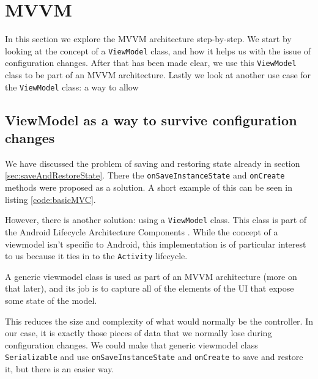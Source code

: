 \section{MVVM}
In this section we explore the MVVM architecture step-by-step. 
We start by looking at the concept of a \lstinline!ViewModel! class, and how it helps us with the issue of configuration changes.
After that has been made clear, we use this \lstinline!ViewModel! class to be part of an MVVM architecture. 
Lastly we look at another use case for the \lstinline!ViewModel! class: a way to allow 

\subsection{ViewModel as a way to survive configuration changes}
We have discussed the problem of saving and restoring state already in section \ref{sec:saveAndRestoreState}. 
There the \lstinline!onSaveInstanceState! and \lstinline!onCreate! methods were proposed as a solution.
A short example of this can be seen in listing \ref{code:basicMVC}.



However, there is another solution: using a \lstinline!ViewModel! class.
This class is part of the Android Lifecycle Architecture Components \cite{viewModelOfficial}.
While the concept of a viewmodel isn't specific to Android, this implementation is of particular interest to us because it ties in to the \lstinline!Activity! lifecycle.

A generic viewmodel class is used as part of an MVVM architecture (more on that later), and its job is to capture all of the elements of the UI that expose some state of the model.

This reduces the size and complexity of what would normally be the controller.
In our case, it is exactly those pieces of data that we normally lose during configuration changes.
We could make that generic viewmodel class \lstinline!Serializable! and use \lstinline!onSaveInstanceState! and \lstinline!onCreate! to save and restore it, but there is an easier way. 

